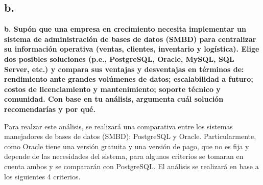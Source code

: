 \subsection*{b.}

\textbf{b. Supón que una empresa en crecimiento necesita implementar un sistema de administración de bases de datos (SMBD) para centralizar su información operativa (ventas, clientes, inventario y logística). Elige dos posibles soluciones (p.e., PostgreSQL, Oracle, MySQL, SQL Server, etc.) y compara sus ventajas y desventajas en términos de: rendimiento ante grandes volúmenes de datos; escalabilidad a futuro; costos de licenciamiento y mantenimiento; soporte técnico y comunidad. Con base en tu análisis, argumenta cuál solución recomendarías y por qué.}

Para realzar este análisis, se realizará una comparativa entre los sistemas manejadores de bases de datos (SMBD): PostgreSQL y Oracle. Particularmente, como Oracle tiene una versión gratuita y una versión de pago, que no es fija y depende de las necesidades del sistema, para algunos criterios se tomaran en cuenta ambos y se compararán con PostgreSQL. El análisis se realizará en base a los siguientes 4 criterios.

